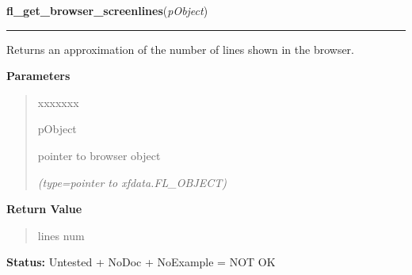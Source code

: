 \hspace{.8\funcindent}\begin{boxedminipage}{\funcwidth}

    \raggedright \textbf{fl\_get\_browser\_screenlines}(\textit{pObject})

    \vspace{-1.5ex}

    \rule{\textwidth}{0.5\fboxrule}
\setlength{\parskip}{2ex}
    Returns an approximation of the number of lines shown in the browser.

\setlength{\parskip}{1ex}
      \textbf{Parameters}
      \vspace{-1ex}

      \begin{quote}
        \begin{Ventry}{xxxxxxx}

          \item[pObject]

          pointer to browser object

            {\it (type=pointer to xfdata.FL\_OBJECT)}

        \end{Ventry}

      \end{quote}

      \textbf{Return Value}
    \vspace{-1ex}

      \begin{quote}
      lines num

      \end{quote}

\textbf{Status:} Untested + NoDoc + NoExample = NOT OK



    \end{boxedminipage}

    \label{xformslib:library:fl_set_browser_topline}

    \vspace{0.5ex}

